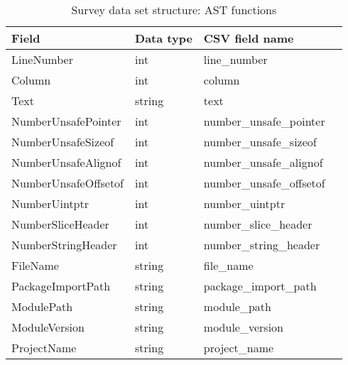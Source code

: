         \begin{table}[h]
            \centering
            \caption{Survey data set structure: AST functions}
            \label{tbl:datastructure-ast-functions}
            \begin{tabular}{llll}
                \toprule
                Field & Data type & CSV field name \\
                \midrule
                LineNumber           & int    & line\_number \\
                Column               & int    & column \\
                Text                 & string & text \\
                NumberUnsafePointer  & int    & number\_unsafe\_pointer \\
                NumberUnsafeSizeof   & int    & number\_unsafe\_sizeof \\
                NumberUnsafeAlignof  & int    & number\_unsafe\_alignof \\
                NumberUnsafeOffsetof & int    & number\_unsafe\_offsetof \\
                NumberUintptr        & int    & number\_uintptr \\
                NumberSliceHeader    & int    & number\_slice\_header \\
                NumberStringHeader   & int    & number\_string\_header \\
                FileName             & string & file\_name \\
                PackageImportPath    & string & package\_import\_path \\
                ModulePath           & string & module\_path \\
                ModuleVersion        & string & module\_version \\
                ProjectName          & string & project\_name \\
                \bottomrule
            \end{tabular}
        \end{table}

